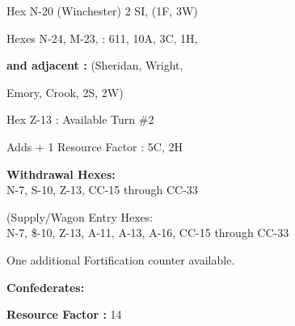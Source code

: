 \begin{scenariodata}
Hex N-20 (Winchester) 2 SI, (1F, 3W)\\
\end{scenariodata}

\begin{scenariodata}
Hexes N-24, M-23, : 611, 10A, 3C, 1H,\\
\end{scenariodata}

\begin{scenariodata}
\textbf{and adjacent :} (Sheridan, Wright,\\
\end{scenariodata}

Emory, Crook, 2S, 2W)

\begin{scenariodata}
Hex Z-13 : Available Turn \#2\\
\end{scenariodata}

\begin{scenariodata}
Adds + 1 Resource Factor : 5C, 2H\\
\end{scenariodata}

\begin{scenariodata}
\textbf{Withdrawal Hexes:}\\
N-7, S-10, Z-13, CC-15 through CC-33\\
\end{scenariodata}

\begin{scenariodata}
(Supply/Wagon Entry Hexes:\\
N-7, \$-10, Z-13, A-11, A-13, A-16, CC-15 through CC-33\\
\end{scenariodata}

\begin{scenariodata}
One additional Fortification counter available.\\
\end{scenariodata}

\begin{scenariodata}
\textbf{Confederates:}\\
\end{scenariodata}

\begin{scenariodata}
\textbf{Resource Factor :} 14\\
\end{scenariodata}

